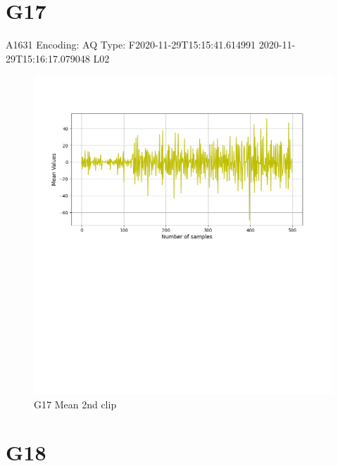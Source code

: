 \documentclass[hidelinks, 12pt, a4paper]{article}
\begin{document}
\section{G17}
A1631
Encoding: AQ
Type: F2020-11-29T15:15:41.614991
2020-11-29T15:16:17.079048
L02
\begin{figure}[h!]
\centering
	\includegraphics[height=.38\textheight, width=\textwidth]{assets/session2/g17.png}
    \caption{G17 Mean 2nd clip}
\end{figure}



\section{G18}
\end{document}
